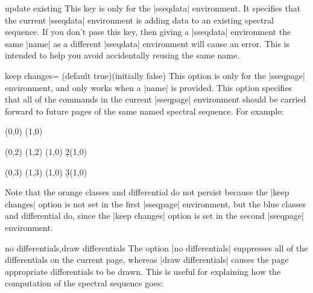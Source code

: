 \documentclass{ltxdoc}
\begin{document}
\begin{sseqdata}[name=ex1,degree={#1}{1-#1}]
\begin{key}{update existing}
This key is only for the |sseqdata| environment. It specifies that the current |sseqdata| environment is adding data to an existing spectral sequence. If you don't pass this key, then giving a |sseqdata| environment the same |name| as a different |sseqdata| environment will cause an error. This is intended to help you avoid accidentally reusing the same name.
\end{key}


\begin{key}{keep changes= (default true)(initially false)}
This option is only for the |sseqpage| environment, and only works when a |name| is provided.
This option specifies that all of the commands in the current |sseqpage| environment should be carried forward to future pages of the same named spectral sequence. For example:
\begin{codeexample}[]
\begin{sseqdata}[name=keep changes example,Adams grading,y range={0}{3}]
\class(0,0)
\class(1,0)
\end{sseqdata}

\begin{sseqpage}[name=keep changes example,sseq=orange]
\class(0,2)
\class(1,2)
\classoptions[orange](1,0)
\d2(1,0)
\end{sseqpage}
%
\hskip1cm
%
\begin{sseqpage}[name=keep changes example,sseq=blue,keep changes]
\class(0,3)
\class(1,3)
\classoptions[blue](1,0)
\d3(1,0)
\end{sseqpage}
%
\hskip1cm
%
\printpage[name=keep changes example,page=3]
\end{codeexample}
Note that the orange classes and differential do not persist because the |keep changes| option is not set in the first |sseqpage| environment, but the blue classes and differential do, since the |keep changes| option is set in the second |sseqpage| environment.
\end{key}



\begin{keylist}{no differentials,draw differentials}
The option |no differentials| suppresses all of the differentials on the current page, whereas |draw differentials| causes the page appropriate differentials to be drawn. This is useful for explaining how the computation of the spectral sequence goes:
\end{keylist}


\end{sseqdata}
\end{document}

